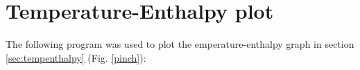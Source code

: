 \chapter{Temperature-Enthalpy plot} %

\label{AppendixA} %

The following program was used to plot the emperature-enthalpy graph in section \ref{sec:tempenthalpy} (Fig. \ref{pinch}):

